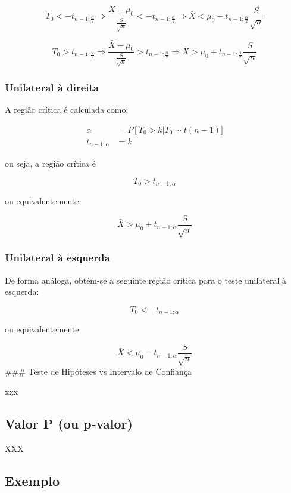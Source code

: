 \documentclass[
]{book}
\begin{document}
\[T_0<-t_{n-1;\frac{\alpha}{2}}\Longrightarrow \frac{\bar X-\mu_0}{\frac{S}{\sqrt n}}<-t_{n-1;\frac{\alpha}{2}}\Longrightarrow\bar X<\mu_0-t_{n-1;\frac{\alpha}{2}}\frac{S}{\sqrt n}\]

\[T_0>t_{n-1;\frac{\alpha}{2}}\Longrightarrow \frac{\bar X-\mu_0}{\frac{S}{\sqrt n}}>t_{n-1;\frac{\alpha}{2}}\Longrightarrow\bar X>\mu_0+t_{n-1;\frac{\alpha}{2}}\frac{S}{\sqrt n}\]

\hypertarget{unilateral-uxe0-direita-1}{%
\subsubsection{Unilateral à direita}\label{unilateral-uxe0-direita-1}}

A região crítica é calculada como:

\[
\begin{aligned}
\alpha&=P\left[T_0>k\right|T_0\sim t(n-1)]\\
t_{n-1;\alpha}&=k
\end{aligned}
\]

ou seja, a região crítica é

\[T_0 > t_{n-1;\alpha}\]

ou equivalentemente

\[\bar X>\mu_0+t_{n-1;\alpha}\frac{S}{\sqrt n}\]

\hypertarget{unilateral-uxe0-esquerda-1}{%
\subsubsection{Unilateral à esquerda}\label{unilateral-uxe0-esquerda-1}}

De forma análoga, obtém-se a seguinte região crítica para o teste unilateral à esquerda:

\[T_0 <- t_{n-1;\alpha}\]

ou equivalentemente

\[\bar X<\mu_0-t_{n-1;\alpha}\frac{S}{\sqrt n}\]
\#\#\# Teste de Hipóteses vs Intervalo de Confiança

xxx

\hypertarget{valor-p-ou-p-valor-1}{%
\subsection{Valor P (ou p-valor)}\label{valor-p-ou-p-valor-1}}

XXX

\hypertarget{exemplo-4}{%
\subsection{Exemplo}\label{exemplo-4}}
\end{document}
